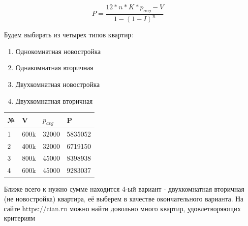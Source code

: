 \begin{equation}
P = \frac{12*n*K*p_{avg} - V}{1-(1-I)^{n}}
\end{equation}

Будем выбирать из четырех типов квартир:
\begin{enumerate}
	\item Однокомнатная новостройка
	\item Однакомнатная вторичная
	\item Двухкомнатная новостройка
	\item Двухкомнатная вторичная
	
\end{enumerate}

\begin{center}
	\begin{tabular}{ | l | l | l | l|}
	\hline
    \textbf{№} & \textbf{V} & \textbf{$p_{avg}$} & \textbf{P}\\ \hline
    1 & 600k & 32000 & 5835052 \\ \hline
    2 & 400k & 32000 & 6719150 \\ \hline
    3 & 800k & 45000 & 8398938 \\ \hline
    4 & 600k & 45000 & 9283037 \\ \hline
	\end{tabular}
\end{center}

Ближе всего к нужно сумме находится 4-ый вариант - двухкомнатная вторичная (не новостройка) квартира, её выберем в качестве окончательного варианта.
На сайте https://cian.ru можно найти довольно много квартир, удовлетворяющих критериям

